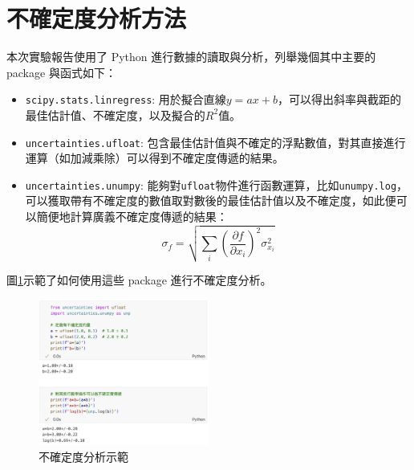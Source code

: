 \documentclass[12pt]{report}
\begin{document}


\section{不確定度分析方法}

本次實驗報告使用了 Python 進行數據的讀取與分析，列舉幾個其中主要的 package 與函式如下：
\begin{itemize}
    \item \verb|scipy.stats.linregress|: 用於擬合直線$y=ax+b$，可以得出斜率與截距的最佳估計值、不確定度，以及擬合的$R^2$值。
    \item \verb|uncertainties.ufloat|: 包含最佳估計值與不確定的浮點數值，對其直接進行運算（如加減乘除）可以得到不確定度傳遞的結果。
    \item \verb|uncertainties.unumpy|: 能夠對\verb|ufloat|物件進行函數運算，比如\verb|unumpy.log|，可以獲取帶有不確定度的數值取對數後的最佳估計值以及不確定度，如此便可以簡便地計算廣義不確定度傳遞的結果：
    \begin{equation}
        \sigma_f = \sqrt{\sum_i \left(\frac{\partial f}{\partial x_i}\right)^2 \sigma_{x_i}^2}
    \end{equation}
\end{itemize}

圖\ref{fig:unc}示範了如何使用這些 package 進行不確定度分析。

\begin{figure}[htbp]
    \centering
    \includegraphics[width=0.5\textwidth]{unc.png}
    \caption{不確定度分析示範}
    \label{fig:unc}
\end{figure}
\end{document}
